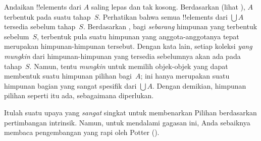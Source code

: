 \documentclass[../../../include/open-logic-section]{subfiles}
\begin{document}
Andaikan !!{element}s dari $A$ saling lepas dan tak kosong. Berdasarkan
\stageshier{} (lihat ), $A$ terbentuk pada suatu
tahap~$S$. Perhatikan bahwa semua !!{element}s dari $\bigcup A$ tersedia
sebelum tahap~$S$. Berdasarkan \stagesacc{}, bagi \emph{sebarang} himpunan
yang terbentuk sebelum~$S$, terbentuk pula suatu himpunan yang
anggota-anggotanya tepat merupakan himpunan-himpunan tersebut. Dengan kata
lain, setiap koleksi \emph{yang mungkin} dari himpunan-himpunan yang tersedia
sebelumnya akan ada pada tahap~$S$. Namun, tentu \emph{mungkin} untuk memilih
objek-objek yang dapat membentuk suatu himpunan pilihan bagi~$A$; ini hanya
merupakan suatu himpunan bagian yang sangat spesifik dari $\bigcup A$.
Dengan demikian, himpunan pilihan seperti itu ada, sebagaimana diperlukan.

Itulah suatu upaya yang \emph{sangat} singkat untuk membenarkan Pilihan
berdasarkan pertimbangan intrinsik. Namun, untuk mendalami gagasan ini, Anda
sebaiknya membaca pengembangan yang rapi oleh Potter
(\citeyear[\S14.8]{Potter2004}).
\end{document}
